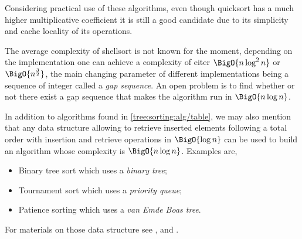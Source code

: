 Considering practical use of these algorithms, even though quicksort has a much higher multiplicative coefficient it is still a good candidate due to its simplicity and cache locality of its operations.

The average complexity of shellsort is not known for the moment, depending on the implementation one can achieve a complexity of eiter $\BigO{n \log^2 n}$ or $\BigO{n^{\frac{3}{2}}}$, the main changing parameter of different implementations being a sequence of integer called a \emph{gap sequence}. An open problem is to find whether or not there exist a gap sequence that makes the algorithm run in $\BigO{n \log n}$.

In addition to algorithms found in \ref{tree:sorting:alg/table}, we may also mention that any data structure allowing to retrieve inserted elements following a total order with insertion and retrieve operations in $\BigO{\log n}$ can be used to build an algorithm whose complexity is $\BigO{n \log n}$. Examples are,

\begin{itemize}
\item Binary tree sort which uses a \emph{binary tree};
\item Tournament sort which uses a \emph{priority queue};
\item Patience sorting which uses a \emph{van Emde Boas tree}.
\end{itemize}

For materials on those data structure see \cite{sleator1985self}, \cite{leiserson2001introduction} and \cite{van1975preserving}.